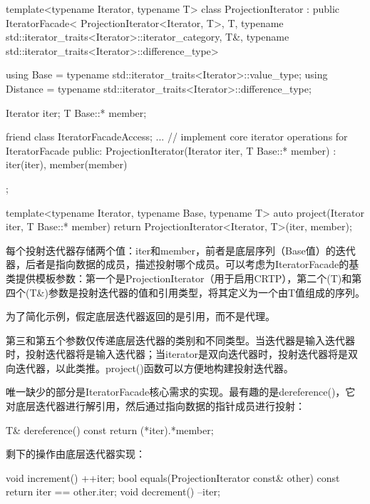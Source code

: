 \begin{cpp}
template<typename Iterator, typename T>
class ProjectionIterator
	: public IteratorFacade<
			ProjectionIterator<Iterator, T>,
			T,
			typename std::iterator_traits<Iterator>::iterator_category,
			T&,
			typename std::iterator_traits<Iterator>::difference_type> {
	using Base = typename std::iterator_traits<Iterator>::value_type;
	using Distance =
		typename std::iterator_traits<Iterator>::difference_type;
	
	Iterator iter;
	T Base::* member;
	
	friend class IteratorFacadeAccess;
	... // implement core iterator operations for IteratorFacade
	public:
	ProjectionIterator(Iterator iter, T Base::* member)
		: iter(iter), member(member) { }
};

template<typename Iterator, typename Base, typename T>
auto project(Iterator iter, T Base::* member) {
	return ProjectionIterator<Iterator, T>(iter, member);
}
\end{cpp}

每个投射迭代器存储两个值：iter和member，前者是底层序列（Base值）的迭代器，后者是指向数据的成员，描述投射哪个成员。可以考虑为IteratorFacade的基类提供模板参数：第一个是ProjectionIterator（用于启用CRTP），第二个(T)和第四个(T\&)参数是投射迭代器的值和引用类型，将其定义为一个由T值组成的序列。

\begin{notice}
为了简化示例，假定底层迭代器返回的是引用，而不是代理。
\end{notice}

第三和第五个参数仅传递底层迭代器的类别和不同类型。当迭代器是输入迭代器时，投射迭代器将是输入迭代器；当iterator是双向迭代器时，投射迭代器将是双向迭代器，以此类推。project()函数可以方便地构建投射迭代器。

唯一缺少的部分是IteratorFacade核心需求的实现。最有趣的是dereference()，它对底层迭代器进行解引用，然后通过指向数据的指针成员进行投射：

\begin{cpp}
T& dereference() const {
	return (*iter).*member;
}
\end{cpp}

剩下的操作由底层迭代器实现：

\begin{cpp}
void increment() {
	++iter;
}
bool equals(ProjectionIterator const& other) const {
	return iter == other.iter;
}
void decrement() {
	--iter;
}
\end{cpp}

